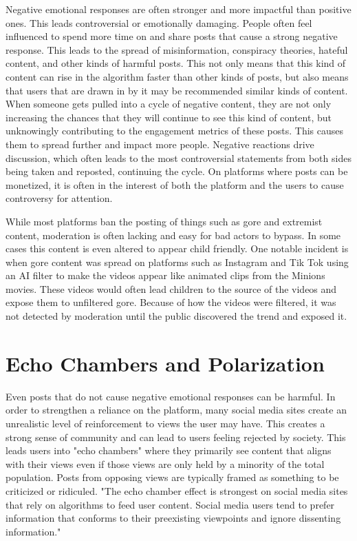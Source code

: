 \documentclass[conference]{IEEEtran}
\begin{document}
Negative emotional responses are often stronger and more impactful than positive ones. This leads controversial or emotionally damaging. People often feel influenced to spend more time on and share posts that cause a strong negative response. This leads to the spread of misinformation, conspiracy theories, hateful content, and other kinds of harmful posts. This not only means that this kind of content can rise in the algorithm faster than other kinds of posts, but also means that users that are drawn in by it may be recommended similar kinds of content. When someone gets pulled into a cycle of negative content, they are not only increasing the chances that they will continue to see this kind of content, but unknowingly contributing to the engagement metrics of these posts. This causes them to spread further and impact more people. Negative reactions drive discussion, which often leads to the most controversial statements from both sides being taken and reposted, continuing the cycle. On platforms where posts can be monetized, it is often in the interest of both the platform and the users to cause controversy for attention.

While most platforms ban the posting of things such as gore and extremist content, moderation is often lacking and easy for bad actors to bypass. In some cases this content is even altered to appear child friendly. One notable incident is when gore content was spread on platforms such as Instagram and Tik Tok using an AI filter to make the videos appear like animated clips from the Minions movies.\cite{Maiberg2025_Minions} These videos would often lead children to the source of the videos and expose them to unfiltered gore. Because of how the videos were filtered, it was not detected by moderation until the public discovered the trend and exposed it.

\section{Echo Chambers and Polarization}
Even posts that do not cause negative emotional responses can be harmful. In order to strengthen a reliance on the platform, many social media sites create an unrealistic level of reinforcement to views the user may have. This creates a strong sense of community and can lead to users feeling rejected by society. This leads users into "echo chambers" where they primarily see content that aligns with their views even if those views are only held by a minority of the total population. Posts from opposing views are typically framed as something to be criticized or ridiculed. "The echo chamber effect is strongest on social media sites that rely on algorithms to feed user content. Social media users tend to prefer information that conforms to their preexisting viewpoints and ignore dissenting information."\cite{Ktepi2021_EchoChamber}
\end{document}
